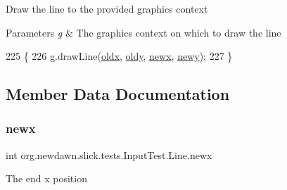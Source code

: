 Draw the line to the provided graphics context


\begin{DoxyParams}{Parameters}
{\em g} & The graphics context on which to draw the line \\
\hline
\end{DoxyParams}

\begin{DoxyCode}
225                                      \{
226             g.drawLine(\mbox{\hyperlink{classorg_1_1newdawn_1_1slick_1_1tests_1_1_input_test_1_1_line_a7c4b8907da6261784c6f61ad8379cbc3}{oldx}}, \mbox{\hyperlink{classorg_1_1newdawn_1_1slick_1_1tests_1_1_input_test_1_1_line_a7349c6da68a0a57fe7687f10c0af912f}{oldy}}, \mbox{\hyperlink{classorg_1_1newdawn_1_1slick_1_1tests_1_1_input_test_1_1_line_ab23fd0b59d5b413dc26c0c86a5f62ba3}{newx}}, \mbox{\hyperlink{classorg_1_1newdawn_1_1slick_1_1tests_1_1_input_test_1_1_line_ada907433d8d222da630e7aabf5f77206}{newy}});
227         \}
\end{DoxyCode}


\subsection{Member Data Documentation}
\mbox{\label{classorg_1_1newdawn_1_1slick_1_1tests_1_1_input_test_1_1_line_ab23fd0b59d5b413dc26c0c86a5f62ba3}} 
\subsubsection{\texorpdfstring{newx}{newx}}
{\footnotesize\ttfamily int org.\+newdawn.\+slick.\+tests.\+Input\+Test.\+Line.\+newx\hspace{0.3cm}{\ttfamily [private]}}

The end x position \mbox{\label{classorg_1_1newdawn_1_1slick_1_1tests_1_1_input_test_1_1_line_ada907433d8d222da630e7aabf5f77206}} 

